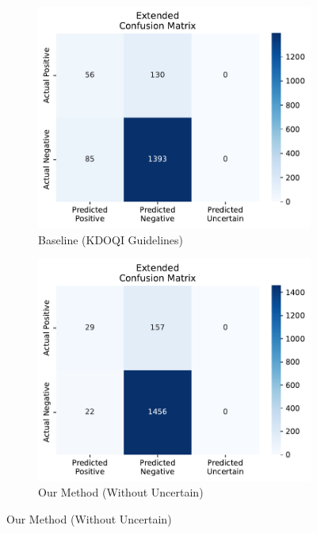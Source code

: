 \documentclass{ieeeaccess}
\begin{document}
\begin{figure}[H]
    \centering
    \begin{subfigure}[b]{0.32\textwidth} %
        \centering
        \includegraphics[width=\linewidth]{new_kdoqi_AVF.pdf}
        \caption{Baseline (KDOQI Guidelines)}
        \label{fig:vascular-access}
    \end{subfigure}
    \hfill
    \begin{subfigure}[b]{0.32\textwidth} %
        \centering
        \includegraphics[width=\linewidth]{new_without_AVF.pdf}
        \caption{Our Method (Without Uncertain)}

\end{subfigure}
\end{figure}
\end{document}
